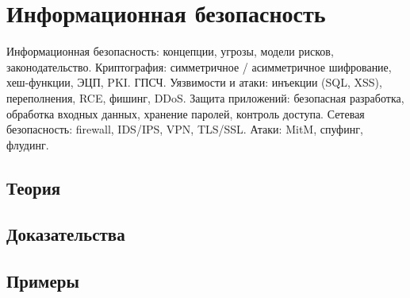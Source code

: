 
\section{Информационная безопасность}
\label{sec:2.3b.10-infosec}

\begin{ticket}
Информационная безопасность: концепции, угрозы, модели рисков, законодательство. Криптография: симметричное / асимметричное шифрование, хеш-функции, ЭЦП, PKI. ГПСЧ. Уязвимости и атаки: инъекции (SQL, XSS), переполнения, RCE, фишинг, DDoS. Защита приложений: безопасная разработка, обработка входных данных, хранение паролей, контроль доступа. Сетевая безопасность: firewall, IDS/IPS, VPN, TLS/SSL. Атаки: MitM, спуфинг, флудинг.
\end{ticket}

\subsection*{Теория}

\subsection*{Доказательства}

\subsection*{Примеры}
